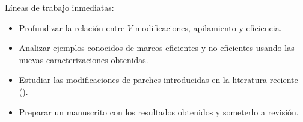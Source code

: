 \documentclass[compress,12pt]{beamer}
\begin{document}
\begin{frame}
Líneas de trabajo inmediatas:
\begin{itemize}
  \item Profundizar la relación entre $V$-modificaciones, apilamiento y eficiencia.
  \item Analizar ejemplos conocidos de marcos eficientes y no eficientes usando las nuevas caracterizaciones obtenidas.
  \item Estudiar las modificaciones de parches introducidas en la literatura reciente (\cite{BalmerGallauer2025PatchDensity, klinke2013yet}).
  \item Preparar un manuscrito con los resultados obtenidos y someterlo a revisión. 
\end{itemize}
\end{frame}


\End
\end{document}
